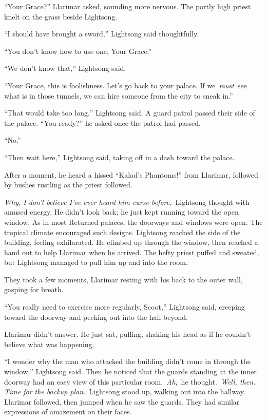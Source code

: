 “Your Grace?” Llarimar asked, sounding more nervous. The portly high priest knelt on the grass beside Lightsong.

“I should have brought a sword,” Lightsong said thoughtfully.

“You don’t know how to use one, Your Grace.”

“We don’t know that,” Lightsong said.

“Your Grace, this is foolishness. Let’s go back to your palace. If we~\textit{must}~see what is in those tunnels, we can hire someone from the city to sneak in.”

“That would take too long,” Lightsong said. A guard patrol passed their side of the palace. “You ready?” he asked once the patrol had passed.

“No.”

“Then wait here,” Lightsong said, taking off in a dash toward the palace.

After a moment, he heard a hissed “Kalad’s Phantoms!” from Llarimar, followed by bushes rustling as the priest followed.

\textit{Why, I don’t believe I’ve ever heard him curse before,}~Lightsong thought with amused energy. He didn’t look back; he just kept running toward the open window. As in most Returned palaces, the doorways and windows were open. The tropical climate encouraged such designs. Lightsong reached the side of the building, feeling exhilarated. He climbed up through the window, then reached a hand out to help Llarimar when he arrived. The hefty priest puffed and sweated, but Lightsong managed to pull him up and into the room.

They took a few moments, Llarimar resting with his back to the outer wall, gasping for breath.

“You really need to exercise more regularly, Scoot,” Lightsong said, creeping toward the doorway and peeking out into the hall beyond.

Llarimar didn’t answer. He just sat, puffing, shaking his head as if he couldn’t believe what was happening.

“I wonder why the man who attacked the building didn’t come in through the window,” Lightsong said. Then he noticed that the guards standing at the inner doorway had an easy view of this particular room.~\textit{Ah,}~he thought.~\textit{Well, then. Time for the backup plan.}~Lightsong stood up, walking out into the hallway. Llarimar followed, then jumped when he saw the guards. They had similar expressions of amazement on their faces.

